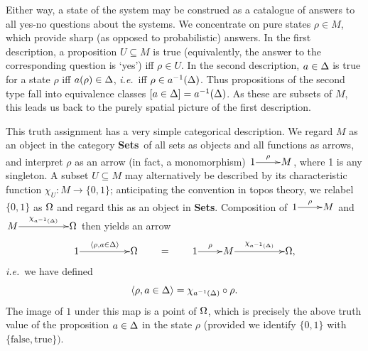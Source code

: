 \documentclass[12pt]{article}
\newcommand{\beq}{\begin{equation}}
\newcommand{\eeq}{\end{equation}}
\newcommand{\Sets}{\mbox{\textbf{Sets}}}
\newcommand{\raw}{\rightarrow} \newcommand{\rat}{\mapsto}
\newcommand{\inv}{^{-1}}
\newcommand{\rh}{\rho} \newcommand{\sg}{\sigma}
\newcommand{\ch}{\chi} \newcommand{\ps}{\psi} \newcommand{\Ps}{\Psi}
\newcommand{\ie}{\textit{i.e.}}
\begin{document}
 Either way, a state of the system may be construed as a catalogue of answers
 to all yes-no questions about the systems. We concentrate on pure states
  $\rh\in M$, which provide sharp (as opposed to probabilistic)
  answers. In the first description, a proposition $U\subseteq M$ is
  true (equivalently, the answer to the corresponding question is
  `yes') iff $\rh\in U$. In the second description, $a\in\Delta$ is true
  for a state $\rh$ iff $a(\rh)\in\Dl$, \ie\ iff $\rh\in a\inv(\Dl)$.
 Thus propositions of the second type fall into equivalence classes
 $[a\in \Delta]=a\inv(\Dl)$. As these are subsets of $M$, this leads us back to the purely spatial picture of the first description.

This truth assignment has a very simple categorical description. We regard
$M$ as an object in the category \Sets\ of all sets as objects and all
functions as arrows, and interpret $\rho$ as an arrow (in fact, a monomorphism)
$\xymatrix@1{1 \ar^-{\rho}[r] & M}$, where 1 is any singleton.
A subset $U\subseteq M$ may
alternatively be described by its characteristic function
$\ch_U:M\raw \{0,1\}$; anticipating the convention  in topos
theory, we relabel $\{0,1\}$ as $\Omega$ and regard this as an
object in \Sets. Composition of  $\xymatrix@1{1\ar^-{\rho}[r]&M}$ and
$\xymatrix@1{M\ar^-{\ch_{a\inv(\Dl)}}[rr]&&\Om}$ then yields an arrow
\beq
  \xymatrix@1{1 \ar^-{\langle \rho,a\in \Dl\rangle}[rr] && \Om}
  \qquad=\qquad
  \xymatrix@1{1 \ar^-{\rho}[r] & M \ar^-{\ch_{a\inv(\Dl)}}[rr] && \Om,}
\eeq
\ie\ we have defined
\beq
\langle \rho,a\in \Dl\rangle=\ch_{a\inv(\Dl)}\circ\rho.\label{circrho}\eeq
The image of $1$ under this map is
a point of $\Omega$, which is precisely the above truth value of
the proposition $a\in \Delta$ in the state $\rho$ (provided we identify
$\{0,1\}$ with $\{\mathrm{false, true}\})$.
\end{document}
